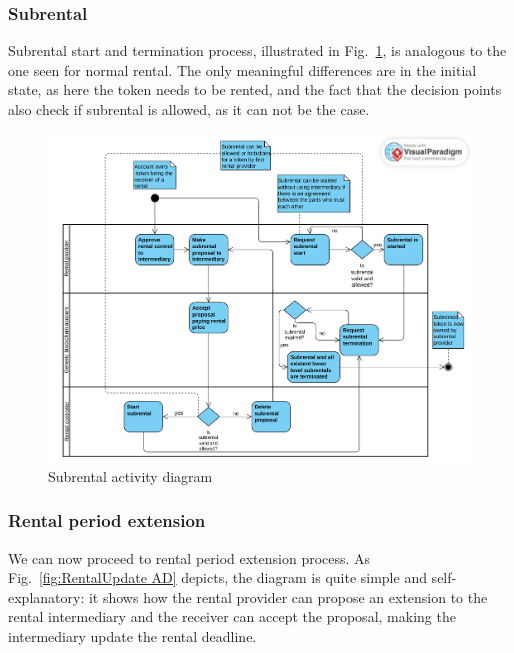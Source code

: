\documentclass[english, LaM, oneside]{sapthesis}%
\begin{document}
\subsubsection{Subrental}

Subrental start and termination process, illustrated in Fig.~\ref{fig:Subrental AD}, is analogous to the one seen for normal rental. The only meaningful differences are in the initial state, as here the token needs to be rented, and the fact that the decision points also check if subrental is allowed, as it can not be the case.

\begin{figure}[H]
    \centering
        \begin{adjustbox}{width=1\textwidth}
            \includegraphics{ActivityDiagrams/activity_subrental.pdf} 
        \end{adjustbox}
    \caption{Subrental activity diagram}
    \label{fig:Subrental AD}
\end{figure}

\subsubsection{Rental period extension}

We can now proceed to rental period extension process. As Fig.~\ref{fig:RentalUpdate AD} depicts, the diagram is quite simple and self-explanatory: it shows how the rental provider can propose an extension to the rental intermediary and the receiver can accept the proposal, making the intermediary update the rental deadline. 
\end{document}
